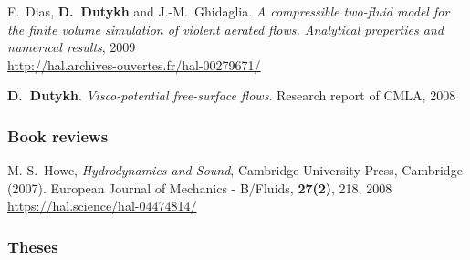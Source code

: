 \begin{etaremune}

  
  \item F.~Dias, \textbf{D.~Dutykh} and J.-M.~Ghidaglia. \textit{A compressible two-fluid model for the finite volume simulation of violent aerated flows. Analytical properties and numerical results}, 2009 \\ %
  \url{http://hal.archives-ouvertes.fr/hal-00279671/}
  

  
  \item \textbf{D.~Dutykh}. \textit{Visco-potential free-surface flows}. Research report of CMLA, 2008 %
  
\end{etaremune}

\separator
\subsubsection{Book reviews}

\begin{etaremune}

  \item M. S.~Howe, \textit{Hydrodynamics and Sound}, Cambridge University Press, Cambridge (2007). European Journal of Mechanics - B/Fluids, \textbf{27(2)}, 218, 2008 \\ %
  \url{https://hal.science/hal-04474814/}
  
\end{etaremune}

\separator
\subsubsection{Theses}

